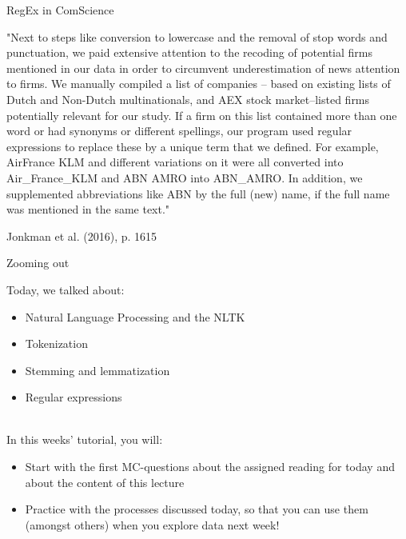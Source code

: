 \documentclass[handout]{beamer}
\begin{document}
\begin{frame}[fragile]{RegEx in ComScience}

\begin{small}
"Next to steps like conversion to lowercase and the removal of stop words and punctuation, we paid extensive attention to the recoding of potential firms mentioned in our data in order to circumvent underestimation of news attention to firms. We manually compiled a list of companies – based on existing lists of Dutch and Non-Dutch multinationals, and AEX stock market–listed firms potentially relevant for our study. If a firm on this list contained more than one word or had synonyms or different spellings, our program used regular expressions to replace these by a unique term that we defined. For example, AirFrance KLM and different variations on it were all converted into Air\_France\_KLM and ABN AMRO into ABN\_AMRO. In addition, we supplemented abbreviations like ABN by the full (new) name, if the full name was mentioned in the same text."
\end{small}
\begin{tiny}
Jonkman et al. (2016), p. 1615 
\end{tiny}

\end{frame}


\begin{frame}{Zooming out} 
	
Today, we talked about:
\begin{itemize}
	\item Natural Language Processing and the NLTK
	\item Tokenization
	\item Stemming and lemmatization
	\item Regular expressions \\\
\end{itemize}
	
In this weeks' tutorial, you will:
\begin{itemize}
	\item Start with the first MC-questions about the assigned reading for today and about the content of this lecture
	\item Practice with the processes discussed today, so that you can use them (amongst others) when you explore data next week!
\end{itemize}
	
\end{frame}
\end{document}
